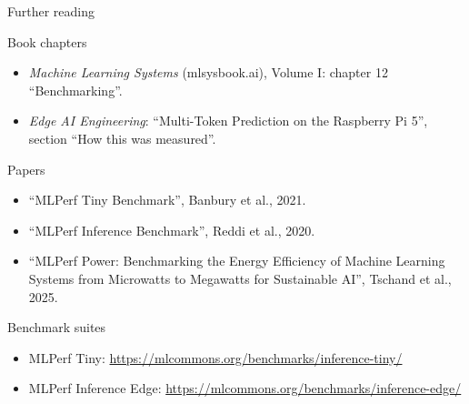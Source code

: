 \begin{frame}{Further reading}
  \footnotesize
  \begin{block}{Book chapters}
    \begin{itemize}
      \item \emph{Machine Learning Systems} (mlsysbook.ai), Volume I: chapter
            12 ``Benchmarking''.
      \item \emph{Edge AI Engineering}: ``Multi-Token Prediction on the
            Raspberry Pi 5'', section ``How this was measured''.
    \end{itemize}
  \end{block}
  \begin{block}{Papers}
    \begin{itemize}
      \item ``MLPerf Tiny Benchmark'', Banbury et al., 2021.
      \item ``MLPerf Inference Benchmark'', Reddi et al., 2020.
      \item ``MLPerf Power: Benchmarking the Energy Efficiency of Machine
            Learning Systems from Microwatts to Megawatts for Sustainable
            AI'', Tschand et al., 2025.
    \end{itemize}
  \end{block}
  \begin{block}{Benchmark suites}
    \begin{itemize}
      \item MLPerf Tiny:
            \url{https://mlcommons.org/benchmarks/inference-tiny/}
      \item MLPerf Inference Edge:
            \url{https://mlcommons.org/benchmarks/inference-edge/}
    \end{itemize}
  \end{block}
\end{frame}
